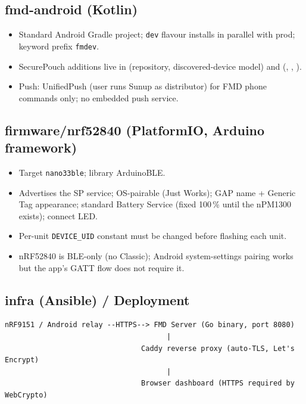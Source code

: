 \documentclass[11pt,a4paper]{article}
\begin{document}
\subsection{fmd-android (Kotlin)}

\begin{itemize}
  \item Standard Android Gradle project; \texttt{dev} flavour installs in parallel with prod; keyword prefix \texttt{fmdev}.
  \item SecurePouch additions live in  (repository, discovered-device model) and  (, , ).
  \item Push: UnifiedPush (user runs Sunup as distributor) for FMD phone commands only; no embedded push service.
\end{itemize}

\subsection{firmware/nrf52840 (PlatformIO, Arduino framework)}

\begin{itemize}
  \item Target \texttt{nano33ble}; library ArduinoBLE.
  \item Advertises the SP service; OS-pairable (Just Works); GAP name + Generic Tag appearance; standard Battery Service (fixed 100\,\% until the nPM1300 exists); connect LED.
  \item Per-unit \texttt{DEVICE\_UID} constant must be changed before flashing each unit.
  \item nRF52840 is BLE-only (no Classic); Android system-settings pairing works but the app's GATT flow does not require it.
\end{itemize}

\subsection{infra (Ansible) / Deployment}

\begin{Verbatim}[frame=single,fontsize=\small]
nRF9151 / Android relay --HTTPS--> FMD Server (Go binary, port 8080)
                                      |
                                Caddy reverse proxy (auto-TLS, Let's Encrypt)
                                      |
                                Browser dashboard (HTTPS required by WebCrypto)
\end{Verbatim}
\end{document}

